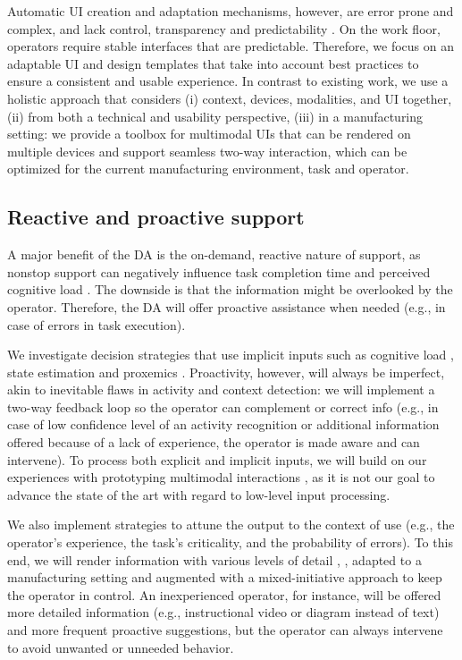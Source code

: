 Automatic UI creation and adaptation mechanisms, however, are error prone and complex, and lack control, transparency and predictability \cite{lavie2010BenefitsCostsAdaptive}. On the work floor, operators require stable interfaces that are predictable. Therefore, we focus on an adaptable UI \cite{bunt2007SupportingInterfaceCustomization} and design templates that take into account best practices \cite{ratzka2013UserInterfacePatterns} to ensure a consistent and usable experience. In contrast to existing work, we use a holistic approach that considers (i) context, devices, modalities, and UI together, (ii) from both a technical and usability perspective, (iii) in a manufacturing setting: we provide a toolbox for multimodal UIs that can be rendered on multiple devices and support seamless two-way interaction, which can be optimized for the current manufacturing environment, task and operator.


\subsection{Reactive and proactive support} \label{sec:ReactiveProactive}
A major benefit of the DA is the on-demand, reactive nature of support, as nonstop support can negatively influence task completion time and perceived cognitive load \cite{funk2017WorkingAugmentedReality}. The downside is that the information might be overlooked by the operator. Therefore, the DA will offer proactive assistance when needed (e.g., in case of errors in task execution). 

We investigate decision strategies that use implicit inputs such as cognitive load \cite{lindlbauer2019ContextAwareOnlineAdaptation}, state estimation and proxemics \cite{Marquardt_2015} \cite{Williamson_2022}. Proactivity, however, will always be imperfect, akin to inevitable flaws in activity and context detection: we will implement a two-way feedback loop so the operator can complement or correct info (e.g., in case of low confidence level of an activity recognition or additional information offered because of a lack of experience, the operator is made aware and can intervene). 
To process both explicit and implicit inputs, we will build on our experiences with prototyping multimodal interactions \cite{eshet2016ContextUseFinal}, as it is not our goal to advance the state of the art with regard to low-level input processing. 

We also implement strategies to attune the output to the context of use (e.g., the operator's experience, the task's criticality, and the probability of errors). To this end, we will render information with various levels of detail \cite{Mezhoudi2015AnAA}, \cite{10.1145/3332165.3347945}, adapted to a manufacturing setting and augmented with a mixed-initiative approach to keep the operator in control. An inexperienced operator, for instance, will be offered more detailed information (e.g., instructional video or diagram instead of text) and more frequent proactive suggestions, but the operator can always intervene to avoid unwanted or unneeded behavior.

